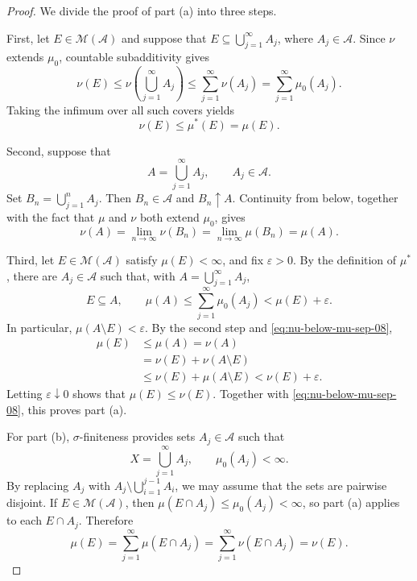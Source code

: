 \begin{proof}
  We divide the proof of part (a) into three steps.

  First, let $E\in\mathcal M(\mathcal A)$ and suppose that
  $E\subseteq\bigcup_{j=1}^{\infty}A_j$, where $A_j\in\mathcal A$.
  Since $\nu$ extends $\mu_0$, countable subadditivity gives
  \[
    \nu(E)
    \leq\nu\left(\bigcup_{j=1}^{\infty}A_j\right)
    \leq\sum_{j=1}^{\infty}\nu(A_j)
    =\sum_{j=1}^{\infty}\mu_0(A_j).
  \]
  Taking the infimum over all such covers yields
  \begin{equation}\label{eq:nu-below-mu-sep-08}
    \nu(E)\leq\mu^*(E)=\mu(E).
  \end{equation}

  Second, suppose that
  \[
    A=\bigcup_{j=1}^{\infty}A_j,
    \qquad A_j\in\mathcal A.
  \]
  Set $B_n=\bigcup_{j=1}^nA_j$. Then $B_n\in\mathcal A$ and
  $B_n\uparrow A$. Continuity from below, together with the fact that
  $\mu$ and $\nu$ both extend $\mu_0$, gives
  \[
    \nu(A)
    =\lim_{n\to\infty}\nu(B_n)
    =\lim_{n\to\infty}\mu(B_n)
    =\mu(A).
  \]

  Third, let $E\in\mathcal M(\mathcal A)$ satisfy $\mu(E)<\infty$,
  and fix $\varepsilon>0$. By the definition of $\mu^*$, there are
  $A_j\in\mathcal A$ such that, with
  $A=\bigcup_{j=1}^{\infty}A_j$,
  \[
    E\subseteq A,
    \qquad
    \mu(A)\leq\sum_{j=1}^{\infty}\mu_0(A_j)
      <\mu(E)+\varepsilon.
  \]
  In particular, $\mu(A\setminus E)<\varepsilon$. By the second step
  and \eqref{eq:nu-below-mu-sep-08},
  \begin{align*}
    \mu(E)
    &\leq\mu(A)
     =\nu(A)\\
    &=\nu(E)+\nu(A\setminus E)\\
    &\leq\nu(E)+\mu(A\setminus E)
     <\nu(E)+\varepsilon.
  \end{align*}
  Letting $\varepsilon\downarrow0$ shows that
  $\mu(E)\leq\nu(E)$. Together with
  \eqref{eq:nu-below-mu-sep-08}, this proves part (a).

  For part (b), $\sigma$-finiteness provides sets
  $A_j\in\mathcal A$ such that
  \[
    X=\bigcup_{j=1}^{\infty}A_j,
    \qquad
    \mu_0(A_j)<\infty.
  \]
  By replacing $A_j$ with
  $A_j\setminus\bigcup_{i=1}^{j-1}A_i$, we may assume that the sets are
  pairwise disjoint. If $E\in\mathcal M(\mathcal A)$, then
  $\mu(E\cap A_j)\leq\mu_0(A_j)<\infty$, so part (a) applies to each
  $E\cap A_j$. Therefore
  \[
    \mu(E)
    =\sum_{j=1}^{\infty}\mu(E\cap A_j)
    =\sum_{j=1}^{\infty}\nu(E\cap A_j)
    =\nu(E).
  \]
\end{proof}

